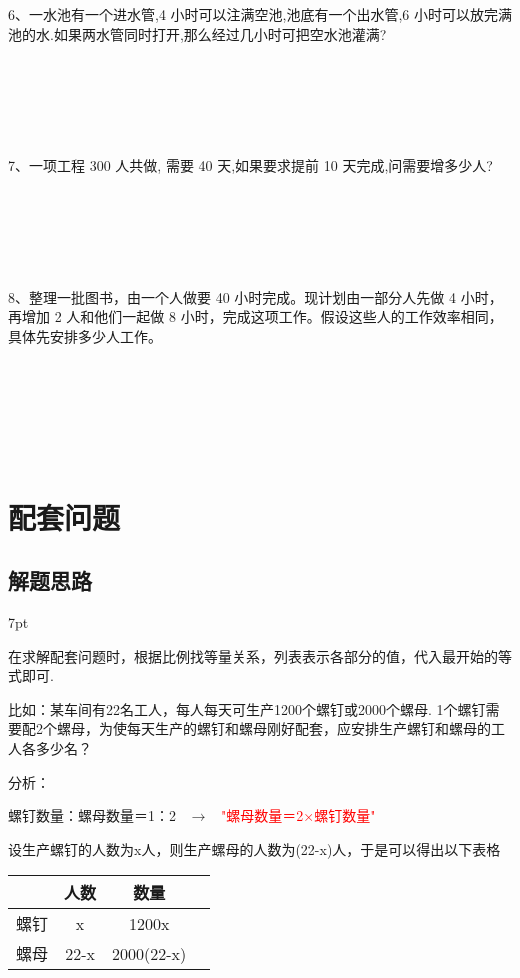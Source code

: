 \documentclass{article}
\newenvironment{wa}{%
\def\FrameCommand{%
\hspace{1pt}%
{\color{LightCoral}\vrule width 2pt}%
{\color{washade}\vrule width 4pt}%
\colorbox{washade}%
}%
\MakeFramed{\advance\hsize-\width\FrameRestore}%
\noindent\hspace{-4.55pt}%
\begin{adjustwidth}{}{7pt}%
\vspace{2pt}\vspace{2pt}%
\normalfont %
}
{%
\vspace{2pt}\end{adjustwidth}\endMakeFramed%
}
\begin{document}
~\\
~\\
~\\
~\\
~\\
6、一水池有一个进水管,4 小时可以注满空池,池底有一个出水管,6 小时可以放完满池的水.如果两水管同时打开,那么经过几小时可把空水池灌满?

~\\
~\\
~\\
~\\
~\\
7、一项工程 300 人共做, 需要 40 天,如果要求提前 10 天完成,问需要增多少人?

~\\
~\\
~\\
~\\
~\\
8、整理一批图书，由一个人做要 40 小时完成。现计划由一部分人先做 4 小时，再增加 2 人和他们一起做 8 小时，完成这项工作。假设这些人的工作效率相同，具体先安排多少人工作。

~\\
~\\
~\\
~\\
~\\

\newpage
\section{配套问题}
\subsection{解题思路}
\begin{wa}
    \quad \quad 在求解配套问题时，根据比例找等量关系，列表表示各部分的值，代入最开始的等式即可. 
\end{wa}
比如：某车间有22名工人，每人每天可生产1200个螺钉或2000个螺母. 1个螺钉需要配2个螺母，为使每天生产的螺钉和螺母刚好配套，应安排生产螺钉和螺母的工人各多少名？

分析：

螺钉数量：螺母数量＝1：2 \ $\rightarrow$ \ \textcolor{red}{"螺母数量＝2×螺钉数量"}

设生产螺钉的人数为x人，则生产螺母的人数为(22-x)人，于是可以得出以下表格
\begin{table}[htbp]
    \centering
    \begin{tabular}{|l|c|c|c|}
        \hline \ & 人数 & 数量  \\
        \hline 螺钉 & x & 1200x \\
        \hline 螺母 & 22-x & 2000(22-x) \\
        \hline
    \end{tabular}
\end{table}
\end{document}
